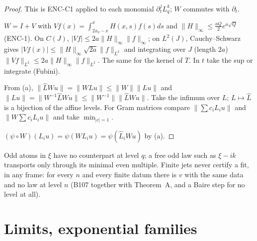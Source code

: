 \begin{proof}
This is ENC-C1 applied to each monomial $\partial_t^jL_q^k$; $W$ commutes with $\partial_t$.

$W=I+V$ with $Vf(x)=\int_{2x_0-x}^xH(x,s)f(s)ds$ and $\|H\|_\infty\le\frac{aQ}2e^{a\sqrt Q}$ (ENC-1). On $C(J)$, $|Vf|\le2a\|H\|_\infty\|f\|_\infty$; on $L^2(J)$, Cauchy--Schwarz gives $|Vf(x)|\le\|H\|_\infty\sqrt{2a}\|f\|_{L^2}$ and integrating over $J$ (length $2a$) $\|Vf\|_{L^2}\le2a\|H\|_\infty\|f\|_{L^2}$. The same for the kernel of $T$. In $t$ take the sup or integrate (Fubini).

From (a), $\|\hat LWu\|=\|WLu\|\le\|W\|\|Lu\|$ and $\|Lu\|=\|W^{-1}\hat LWu\|\le\|W^{-1}\|\|\hat LWu\|$. Take the infimum over $L$; $L\mapsto\hat L$ is a bijection of the affine levels. For Gram matrices compare $\|\sum c_iL_iu\|$ and $\|W\sum c_iL_iu\|$ and take $\min_{|c|=1}$.

$(\psi\circ W)(L_iu)=\psi(WL_iu)=\psi(\hat L_iWu)$ by (a).

\end{proof}

\begin{caution}[title=What R6 does not give]
Odd atoms in $\xi$ have no counterpart at level $q$; a free odd law such as $\xi-ik$ transports only through its minimal even multiple. Finite jets never certify a fit, in any frame: for every $n$ and every finite datum there is $v$ with the same data and no law at level $n$ (B107 together with Theorem~A, and a Baire step for no level at all).
\end{caution}

\section{Limits, exponential families}


